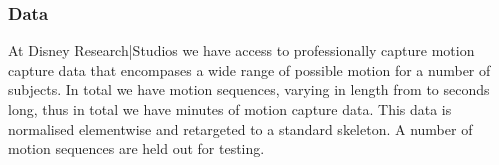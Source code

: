 \subsubsection{Data}
At Disney Research|Studios we have access to professionally capture motion capture data that encompases a wide range of possible motion for a number of subjects. In total we have  motion sequences, varying in length from  to  seconds long, thus in total we have  minutes of motion capture data. This data is normalised elementwise and retargeted to a standard skeleton. A number of motion sequences are held out for testing.

